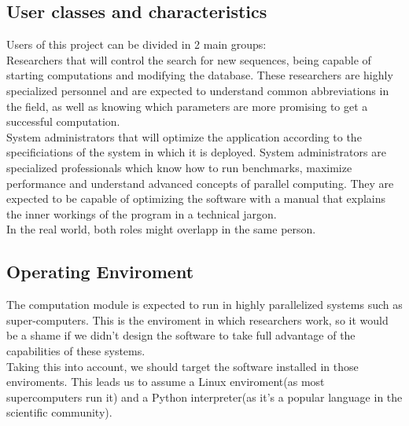   \subsection{User classes and characteristics}

  Users of this project can be divided in 2 main groups:\\

  Researchers that will control the search for new sequences, being capable of
  starting computations and modifying the database. These researchers are highly
  specialized personnel and are expected to understand common abbreviations in
  the field, as well as knowing which parameters are more promising to get a
  successful computation.\\

  System administrators that will optimize the application according to the
  specificiations of the system in which it is deployed. System administrators
  are specialized professionals which know how to run benchmarks, maximize
  performance and understand advanced concepts of parallel computing. They are
  expected to be capable of optimizing the software with a manual that explains
  the inner workings of the program in a technical jargon.\\

  In the real world, both roles might overlapp in the same person.\\

  \subsection{Operating Enviroment}

  The computation module is expected to run in highly parallelized systems such
  as super-computers. This is the enviroment in which researchers work, so it
  would be a shame if we didn't design the software to take full advantage of
  the capabilities of these systems.\\

  Taking this into account, we should target the software installed in those
  enviroments. This leads us to assume a Linux enviroment(as most supercomputers
  run it) and a Python interpreter(as it's a popular language in the scientific
  community).\\
